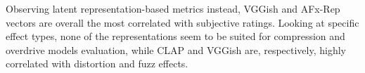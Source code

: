 Observing latent representation-based metrics instead, VGGish and AFx-Rep vectors are overall the most correlated with subjective ratings.
Looking at specific effect types, none of the representations seem to be suited for compression and overdrive models evaluation, while CLAP and VGGish are, respectively, highly correlated with distortion and fuzz effects.




